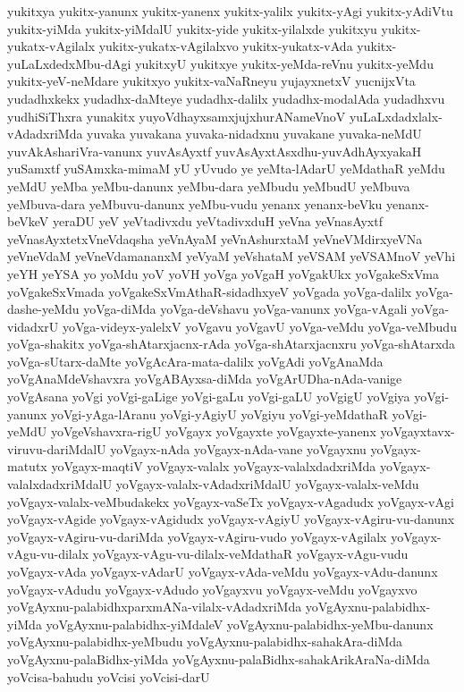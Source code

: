 {yukitxya
yukitx-yanunx
yukitx-yanenx
yukitx-yalilx
yukitx-yAgi
yukitx-yAdiVtu
yukitx-yiMda
yukitx-yiMdalU
yukitx-yide
yukitx-yilalxde
yukitxyu
yukitx-yukatx-vAgilalx
yukitx-yukatx-vAgilalxvo
yukitx-yukatx-vAda
yukitx-yuLaLxdedxMbu-dAgi
yukitxyU
yukitxye
yukitx-yeMda-reVnu
yukitx-yeMdu
yukitx-yeV-neMdare
yukitxyo
yukitx-vaNaRneyu
yujayxnetxV
yucnijxVta
yudadhxkekx
yudadhx-daMteye
yudadhx-dalilx
yudadhx-modalAda
yudadhxvu
yudhiSiThxra
yunakitx
yuyoVdhayxsamxjujxhurANameVnoV
yuLaLxdadxlalx-vAdadxriMda
yuvaka
yuvakana
yuvaka-nidadxnu
yuvakane
yuvaka-neMdU
yuvAkAshariVra-vanunx
yuvAsAyxtf
yuvAsAyxtAsxdhu-yuvAdhAyxyakaH
yuSamxtf
yuSAmxka-mimaM
yU
yUvudo
ye
yeMta-lAdarU
yeMdathaR
yeMdu
yeMdU
yeMba
yeMbu-danunx
yeMbu-dara
yeMbudu
yeMbudU
yeMbuva
yeMbuva-dara
yeMbuvu-danunx
yeMbu-vudu
yenanx
yenanx-beVku
yenanx-beVkeV
yeraDU
yeV
yeVtadivxdu
yeVtadivxduH
yeVna
yeVnasAyxtf
yeVnasAyxtetxVneVdaqsha
yeVnAyaM
yeVnAshurxtaM
yeVneVMdirxyeVNa
yeVneVdaM
yeVneVdamananxM
yeVyaM
yeVshataM
yeVSAM
yeVSAMnoV
yeVhi
yeYH
yeYSA
yo
yoMdu
yoV
yoVH
yoVga
yoVgaH
yoVgakUkx
yoVgakeSxVma
yoVgakeSxVmada
yoVgakeSxVmAthaR-sidadhxyeV
yoVgada
yoVga-dalilx
yoVga-dashe-yeMdu
yoVga-diMda
yoVga-deVshavu
yoVga-vanunx
yoVga-vAgali
yoVga-vidadxrU
yoVga-videyx-yalelxV
yoVgavu
yoVgavU
yoVga-veMdu
yoVga-veMbudu
yoVga-shakitx
yoVga-shAtarxjacnx-rAda
yoVga-shAtarxjacnxru
yoVga-shAtarxda
yoVga-sUtarx-daMte
yoVgAcAra-mata-dalilx
yoVgAdi
yoVgAnaMda
yoVgAnaMdeVshavxra
yoVgABAyxsa-diMda
yoVgArUDha-nAda-vanige
yoVgAsana
yoVgi
yoVgi-gaLige
yoVgi-gaLu
yoVgi-gaLU
yoVgigU
yoVgiya
yoVgi-yanunx
yoVgi-yAga-lAranu
yoVgi-yAgiyU
yoVgiyu
yoVgi-yeMdathaR
yoVgi-yeMdU
yoVgeVshavxra-rigU
yoVgayx
yoVgayxte
yoVgayxte-yanenx
yoVgayxtavx-viruvu-dariMdalU
yoVgayx-nAda
yoVgayx-nAda-vane
yoVgayxnu
yoVgayx-matutx
yoVgayx-maqtiV
yoVgayx-valalx
yoVgayx-valalxdadxriMda
yoVgayx-valalxdadxriMdalU
yoVgayx-valalx-vAdadxriMdalU
yoVgayx-valalx-veMdu
yoVgayx-valalx-veMbudakekx
yoVgayx-vaSeTx
yoVgayx-vAgadudx
yoVgayx-vAgi
yoVgayx-vAgide
yoVgayx-vAgidudx
yoVgayx-vAgiyU
yoVgayx-vAgiru-vu-danunx
yoVgayx-vAgiru-vu-dariMda
yoVgayx-vAgiru-vudo
yoVgayx-vAgilalx
yoVgayx-vAgu-vu-dilalx
yoVgayx-vAgu-vu-dilalx-veMdathaR
yoVgayx-vAgu-vudu
yoVgayx-vAda
yoVgayx-vAdarU
yoVgayx-vAda-veMdu
yoVgayx-vAdu-danunx
yoVgayx-vAdudu
yoVgayx-vAdudo
yoVgayxvu
yoVgayx-veMdu
yoVgayxvo
yoVgAyxnu-palabidhxparxmANa-vilalx-vAdadxriMda
yoVgAyxnu-palabidhx-yiMda
yoVgAyxnu-palabidhx-yiMdaleV
yoVgAyxnu-palabidhx-yeMbu-danunx
yoVgAyxnu-palabidhx-yeMbudu
yoVgAyxnu-palabidhx-sahakAra-diMda
yoVgAyxnu-palaBidhx-yiMda
yoVgAyxnu-palaBidhx-sahakArikAraNa-diMda
yoVcisa-bahudu
yoVcisi
yoVcisi-darU
}
